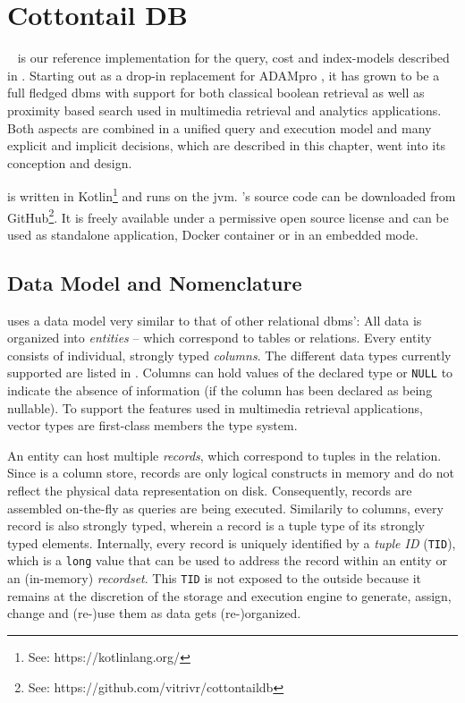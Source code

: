 \chapter{Cottontail DB}
\label{chapter:cottontaildb}

\cottontail{}~\cite{Gasser:2020cottontail} is our reference implementation for the query, cost and index-models described in . Starting out as a drop-in replacement for ADAMpro \cite{Giangreco:2016adam}, it has grown to be a full fledged \acrshort{dbms} with support for both classical boolean retrieval as well as proximity based search used in multimedia retrieval and analytics applications. Both aspects are combined in a unified query and execution model and many explicit and implicit decisions, which are described in this chapter, went into its conception and design.

\cottontail{} is written in Kotlin\footnote{See: https://kotlinlang.org/} and runs on the \acrfull{jvm}. \cottontail{}'s source code can be downloaded from GitHub\footnote{See: https://github.com/vitrivr/cottontaildb}. It is freely available under a permissive open source license and can be used as standalone application, Docker container or in an embedded mode.

\section{Data Model and Nomenclature} 

\cottontail{} uses a data model very similar to that of other relational \acrshort{dbms}': All data is organized into \emph{entities} -- which correspond to tables or relations. Every entity consists of individual, strongly typed \emph{columns}. The different data types currently supported are listed in . Columns can hold values of the declared type or \texttt{NULL} to indicate the absence of information (if the column has been declared as being nullable). To support the features used in multimedia retrieval applications, vector types are first-class members the type system.

An entity can host multiple \emph{records}, which correspond to tuples in the relation. Since \cottontail{} is a column store, records are only logical constructs in memory and do not reflect the physical data representation on disk. Consequently, records are assembled on-the-fly as queries are being executed. Similarily to columns, every record is also strongly typed, wherein a record is a tuple type of its strongly typed elements. Internally, every record is uniquely identified by a \emph{tuple ID} (\texttt{TID}), which is a \texttt{long} value that can be used to address the record within an entity or an (in-memory) \emph{recordset}. This \texttt{TID} is not exposed to the outside because it remains at the discretion of the storage and execution engine to generate, assign, change and (re-)use them as data gets (re-)organized.

